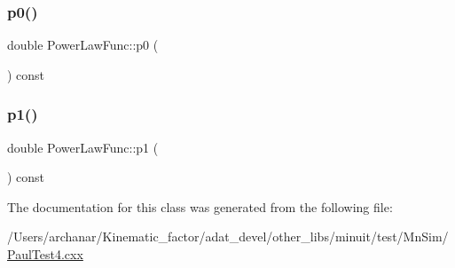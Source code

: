 \subsubsection{\texorpdfstring{p0()}{p0()}}
{\footnotesize\ttfamily double Power\+Law\+Func\+::p0 (\begin{DoxyParamCaption}{ }\end{DoxyParamCaption}) const\hspace{0.3cm}{\ttfamily [inline]}}

\mbox{\label{classPowerLawFunc_a99c19d6a15b5efa68b17875afc619b08}} 
\subsubsection{\texorpdfstring{p1()}{p1()}}
{\footnotesize\ttfamily double Power\+Law\+Func\+::p1 (\begin{DoxyParamCaption}{ }\end{DoxyParamCaption}) const\hspace{0.3cm}{\ttfamily [inline]}}



The documentation for this class was generated from the following file\+:\begin{DoxyCompactItemize}
\item 
/\+Users/archanar/\+Kinematic\+\_\+factor/adat\+\_\+devel/other\+\_\+libs/minuit/test/\+Mn\+Sim/\mbox{\hyperlink{PaulTest4_8cxx}{Paul\+Test4.\+cxx}}\end{DoxyCompactItemize}
